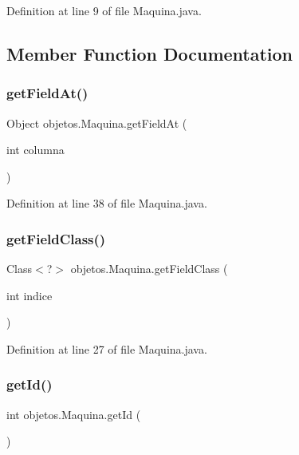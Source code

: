 Definition at line 9 of file Maquina.\+java.



\subsection{Member Function Documentation}
\mbox{\label{classobjetos_1_1_maquina_ab50c4dec88d2de79313a9a369df0ffd3}} 
\subsubsection{\texorpdfstring{get\+Field\+At()}{getFieldAt()}}
{\footnotesize\ttfamily Object objetos.\+Maquina.\+get\+Field\+At (\begin{DoxyParamCaption}\item[{int}]{columna }\end{DoxyParamCaption})}



Definition at line 38 of file Maquina.\+java.

\mbox{\label{classobjetos_1_1_maquina_a8ecfb51ac52f34402a48c572aa710297}} 
\subsubsection{\texorpdfstring{get\+Field\+Class()}{getFieldClass()}}
{\footnotesize\ttfamily Class$<$?$>$ objetos.\+Maquina.\+get\+Field\+Class (\begin{DoxyParamCaption}\item[{int}]{indice }\end{DoxyParamCaption})}



Definition at line 27 of file Maquina.\+java.

\mbox{\label{classobjetos_1_1_maquina_aca30cab810f1072e9ab07024d6f97cc6}} 
\subsubsection{\texorpdfstring{get\+Id()}{getId()}}
{\footnotesize\ttfamily int objetos.\+Maquina.\+get\+Id (\begin{DoxyParamCaption}{ }\end{DoxyParamCaption})}



